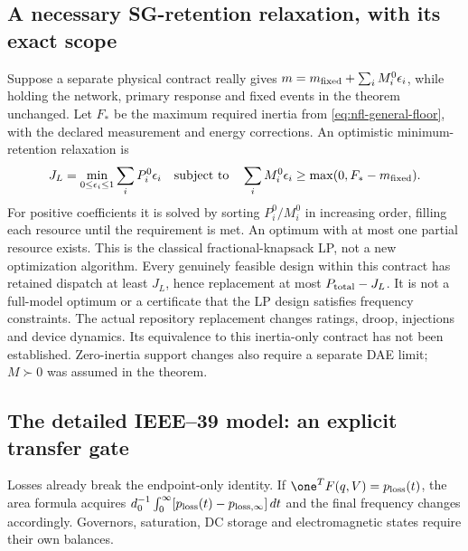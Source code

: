 \subsection{A necessary SG-retention relaxation, with its exact scope}
Suppose a separate physical contract really gives
$m=m_{\rm fixed}+\sum_iM_i^0\epsilon_i$, while holding the network, primary
response and fixed events in the theorem unchanged. Let
$F_*$ be the maximum required inertia from
\eqref{eq:nfl-general-floor}, with the declared measurement and energy
corrections. An optimistic minimum-retention relaxation is
\begin{equation}
 J_L=\min_{0\leq\epsilon_i\leq1}\sum_i P_i^0\epsilon_i
 \quad\text{subject to}\quad
 \sum_iM_i^0\epsilon_i\geq\max(0,F_*-m_{\rm fixed}).
 \label{eq:nfl-retention-lp}
\end{equation}
For positive coefficients it is solved by sorting $P_i^0/M_i^0$ in
increasing order, filling each resource until the requirement is met.
An optimum with at most one partial resource exists. This is the classical
fractional-knapsack LP, not a new optimization algorithm.
Every genuinely feasible design within this contract has retained
dispatch at least $J_L$, hence replacement at most
$P_{\rm total}-J_L$. It is not a full-model optimum or a certificate
that the LP design satisfies frequency constraints.
The actual repository replacement changes ratings, droop, injections and
device dynamics. Its equivalence to this inertia-only contract has not
been established. Zero-inertia support changes also require a separate
DAE limit; $M\succ0$ was assumed in the theorem.

\subsection{The detailed IEEE--39 model: an explicit transfer gate}
Losses already break the endpoint-only identity. If
$\one^TF(q,V)=p_{\rm loss}(t)$, the area formula acquires
$d_0^{-1}\int_0^\infty[p_{\rm loss}(t)-p_{{\rm loss},\infty}]\,dt$
and the final frequency changes accordingly. Governors, saturation,
DC storage and electromagnetic states require their own balances.

